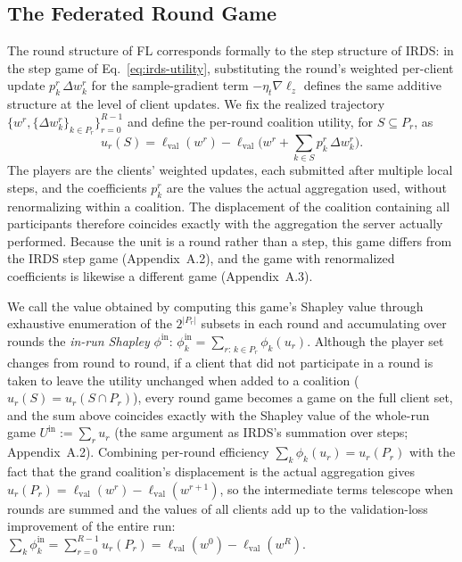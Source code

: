 \documentclass[letterpaper]{article} %
\theoremstyle{definition} %
\newcommand{\lval}{\ell_{\mathrm{val}}} %
\begin{document}
\subsection{The Federated Round Game}
\label{sec:game}

The round structure of FL corresponds formally to the step structure of IRDS:
in the step game of Eq.~\eqref{eq:irds-utility}, substituting the round's
weighted per-client update $p_k^r\,\Delta w_k^r$ for the sample-gradient term
$-\eta_t \nabla\ell_z$ defines the same additive structure at the level of
client updates. We fix the realized trajectory
$\{w^r, \{\Delta w_k^r\}_{k \in P_r}\}_{r=0}^{R-1}$ and define the per-round
coalition utility, for $S \subseteq P_r$, as
\begin{equation}\label{eq:round-utility}
u_r(S) = \lval(w^r)
- \lval\Big(w^r + \textstyle\sum_{k \in S} p_k^r\, \Delta w_k^r\Big).
\end{equation}
The players are the clients' weighted updates, each submitted after multiple
local steps, and the coefficients $p_k^r$ are the values the actual
aggregation used, without renormalizing within a coalition. The displacement
of the coalition containing all participants therefore coincides exactly with
the aggregation the server actually performed. Because the unit is a round
rather than a step, this game differs from the IRDS step game
(Appendix~A.2), and the game with renormalized coefficients is likewise a
different game (Appendix~A.3).

We call the value obtained by computing this game's Shapley value through
exhaustive enumeration of the $2^{|P_r|}$ subsets in each round and
accumulating over rounds the \emph{in-run Shapley} $\phi^{\mathrm{in}}$:
$\phi_k^{\mathrm{in}} = \sum_{r:\, k \in P_r} \phi_k(u_r)$. Although the
player set changes from round to round, if a client that did not participate
in a round is taken to leave the utility unchanged when added to a coalition
($u_r(S) = u_r(S \cap P_r)$), every round game becomes a game on the full
client set, and the sum above coincides exactly with the Shapley value of the
whole-run game $U^{\mathrm{in}} := \sum_r u_r$ (the same argument as IRDS's
summation over steps; Appendix~A.2). Combining per-round efficiency
$\sum_k \phi_k(u_r) = u_r(P_r)$ with the fact that the grand coalition's
displacement is the actual aggregation gives
$u_r(P_r) = \lval(w^r) - \lval(w^{r+1})$, so the intermediate terms telescope
when rounds are summed and the values of all clients add up to the
validation-loss improvement of the entire run:
$\sum_k \phi_k^{\mathrm{in}} = \sum_{r=0}^{R-1} u_r(P_r)
= \lval(w^0) - \lval(w^R)$.
\end{document}
